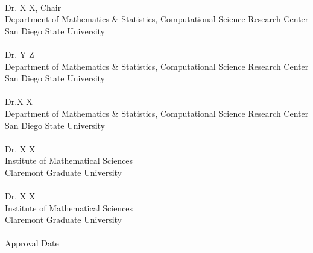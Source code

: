 \documentclass[11pt]{Thesis} %
\begin{document}
      \begin{center}
      \HRulee \\ %
      Dr. X X, Chair \\
      Department of Mathematics \& Statistics, Computational Science Research Center \\
      San Diego State University \\[1.2cm]
      
       \HRulee \\ %
      Dr. Y Z\\
      Department of Mathematics \& Statistics, Computational Science Research Center \\
      San Diego State University \\[1.2cm]
      
           \HRulee \\ %
      Dr.X X \\
      Department of Mathematics \& Statistics, Computational Science Research Center \\
      San Diego State University \\[1.2cm]
      
      \HRulee \\ %
      Dr. X X  \\
     Institute of Mathematical Sciences \\
      Claremont Graduate University \\[1.2cm]
      
       \HRulee \\%
      Dr. X X \\
      Institute of Mathematical Sciences \\
      Claremont Graduate University \\[1.2cm]
      
        \hRule \\
        Approval Date
      
  
 \end{center}
\end{document}
